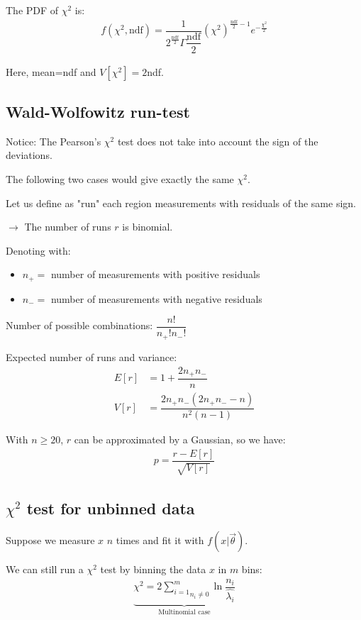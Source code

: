 The PDF of $\chi^2$ is: 
\begin{align}
  f(\chi^2, \text{ndf}) = \dfrac{1}{2^{\frac{\text{ndf}}{2}} \Gamma \dfrac{\text{ndf}}{2}} (\chi^2)^{\frac{\text{ndf}}{2}-1} e^{-\frac{\chi^2}{2}}
\end{align}

Here, mean=ndf and $V[\chi^2]=2$ndf. 

\subsection{Wald-Wolfowitz run-test}
Notice: The Pearson's $\chi^2$ test does not take into account the sign of the deviations. 

The following two cases would give exactly the same $\chi^2$.

Let us define as "run" each region measurements with residuals of the same sign. 

$\to$ The number of runs $r$ is binomial. 

Denoting with:
\begin{itemize}[$\to$]
  \item $n_+=$ number of measurements with positive residuals 
  \item $n_-=$ number of measurements with negative residuals
\end{itemize}

Number of possible combinations: $\dfrac{n!}{n_+!n_-!}$

Expected number of runs and variance:
\begin{align}
  E[r] &= 1 + \dfrac{2n_+n_-}{n} \\
  V[r] &= \dfrac{2n_+n_-(2n_+n_- - n)}{n^2(n-1)}
\end{align}

With $n\geq20$, $r$ can be approximated by a Gaussian, so we have: 
\begin{align}
  p = \dfrac{r - E[r]}{\sqrt{V[r]}}
\end{align}

\subsection{$\chi^2$ test for unbinned data}
Suppose we measure $x$ $n$ times and fit it with $f(x|\vec{\theta})$.

We can still run a $\chi^2$ test by binning the data $x$ in $m$ bins: 
\begin{align}
  \underset{\text{Multinomial case}}{\underbrace{\chi^2 = 2 \underset{n_i \neq 0}{\sum \limits_{i=1}^m} \ln \dfrac{n_i}{\hat{\lambda_i}}}}
\end{align}

